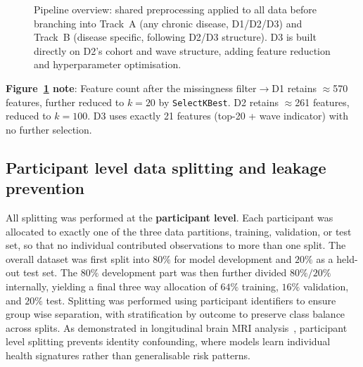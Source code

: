 \begin{figure}[ht]
{
}
\caption{Pipeline overview: shared preprocessing applied to all data before branching into Track~A (any chronic disease, D1/D2/D3) and Track~B (disease specific, following D2/D3 structure). D3 is built directly on D2's cohort and wave structure, adding feature reduction and hyperparameter optimisation.}\label{fig:pipeline_flowchart}
\end{figure}
\clearpage

\textbf{Figure~\ref{fig:pipeline_flowchart} note}: Feature count after the missingness filter$\rightarrow$D1 retains $\approx$570 features, further reduced to $k=20$ by \texttt{SelectKBest}. D2 retains $\approx$261 features, reduced to $k=100$. D3 uses exactly 21 features (top-20 + wave indicator) with no further selection.

\subsection{Participant level data splitting and leakage prevention}
All splitting was performed at the \textbf{participant level}. Each participant was allocated to exactly one of the three data partitions, training, validation, or test set, so that no individual contributed observations to more than one split. The overall dataset was first split into $80\%$ for model development and $20\%$ as a held-out test set. The $80\%$ development part was then further divided $80\%/20\%$ internally, yielding a final three way allocation of $64\%$ training, $16\%$ validation, and $20\%$ test. Splitting was performed using participant identifiers to ensure group wise separation, with stratification by outcome to preserve class balance across splits. As demonstrated in longitudinal brain \gls{MRI} analysis~\cite{rumalaHowYouSplit2023c}, participant level splitting prevents identity confounding, where models learn individual health signatures rather than generalisable risk patterns.

